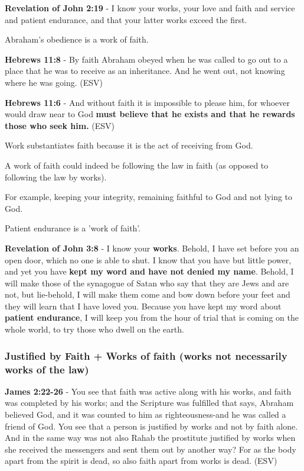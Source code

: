 \documentclass[11pt]{article}
\begin{document}
\textbf{Revelation of John 2:19} - I know your works, your love and faith and service and patient endurance, and that your latter works exceed the first.

Abraham's obedience is a work of faith.

\textbf{Hebrews 11:8} - By faith Abraham obeyed when he was called to go out to a place that he was to receive as an inheritance. And he went out, not knowing where he was going. (ESV)

\textbf{Hebrews 11:6} - And without faith it is impossible to please him, for whoever would draw near to God \textbf{must believe that he exists and that he rewards those who seek him.} (ESV)

Work substantiates faith because it is the act of receiving from God.

A work of faith could indeed be following the law in faith (as opposed to following the law by works).

For example, keeping your integrity, remaining faithful to God and not lying to God.

Patient endurance is a 'work of faith'.

\textbf{Revelation of John 3:8} - I know your \textbf{works}. Behold, I have set before you an open door, which no one is able to shut. I know that you have but little power, and yet you have \textbf{kept my word and have not denied my name}. Behold, I will make those of the synagogue of Satan who say that they are Jews and are not, but lie-behold, I will make them come and bow down before your feet and they will learn that I have loved you. Because you have kept my word about \textbf{patient endurance}, I will keep you from the hour of trial that is coming on the whole world, to try those who dwell on the earth.

\subsubsection{Justified by Faith + Works of faith (works not necessarily works of the law)}
\label{sec:org9afbe1b}
\textbf{James 2:22-26} - You see that faith was active along with his works, and faith was completed by his works; and the Scripture was fulfilled that says, Abraham believed God, and it was counted to him as righteousness-and he was called a friend of God. You see that a person is justified by works and not by faith alone. And in the same way was not also Rahab the prostitute justified by works when she received the messengers and sent them out by another way? For as the body apart from the spirit is dead, so also faith apart from works is dead. (ESV)
\end{document}
